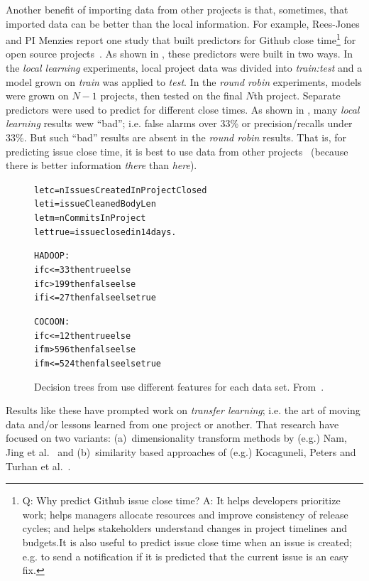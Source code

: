Another benefit of  importing data from other projects is that, sometimes,
that imported data can be better than the local information.
For example, Rees-Jones and PI Menzies
report one study that built  predictors
for Github  close time\footnote{Q: Why predict Github issue close time? A:
 It helps developers prioritize work; helps managers allocate resources and improve consistency of release cycles; and helps stakeholders understand changes in project timelines and budgets.It is also useful to predict issue close time when an issue is created; e.g.  to send a notification if it is predicted that the current issue is an easy fix.}
 for open source projects~\cite{rees2017better}. As shown in ,
these predictors were built in two ways.
In the {\em local learning} experiments,
local  project data was divided into 
{\em train:test} and  a
  model grown on {\em train} was applied to 
{\em test}.  In the {\em round robin} experiments,
models were grown on $N-1$ projects,
then tested on the final $N$th project. 
Separate  predictors were used to predict for different close times.
As shown in ,
many {\em local learning} results wew
  ``bad'';
i.e. false alarms over 33\% or precision/recalls
under 33\%. But such ``bad'' results are absent in the {\em round robin} results.
That is, for predicting  issue close time, it is best to use data from other  projects~\cite{rees2017better}
(because there is better  information {\em there}
than {\em here}).

 \begin{figure}
   {\scriptsize
  \renewcommand{\baselinestretch}{.80} 
 \begin{alltt}   
  {\sffamily let} c    = nIssuesCreatedInProjectClosed
  {\sffamily let} i    = issueCleanedBodyLen
  {\sffamily let} m    = nCommitsInProject 
  {\sffamily let} true = issue closed in 14 days. 
    
  HADOOP:     
  {\sffamily if} c <= 33 {\sffamily then} true {\sffamily else} 
     {\sffamily if} c > 199 {\sffamily then} false {\sffamily else}
        {\sffamily if}  i <= 27 {\sffamily then} false {\sffamily else} true 
 
  COCOON:  
  {\sffamily if} c <= 12 {\sffamily then} true {\sffamily else}
     {\sffamily if} m > 596 {\sffamily then} false {\sffamily else}
        {\sffamily if} m <= 524 {\sffamily then} false {\sffamily else} true\end{alltt}}
  \caption{ Decision trees from   use different features for each  data set. From~\protect\cite{rees2017better}.}\label{fig:unstable} 
 \end{figure}	Results like  these have prompted   work on {\em transfer learning};
i.e.  the art of moving data and/or lessons learned from one project or another.
That research have focused on two  variants: (a)~dimensionality transform  methods by (e.g.) Nam, 
Jing et al.~\cite{nam2017heterogeneous,Nam2015,Jing2015} and (b)~similarity based 
approaches of (e.g.) Kocaguneli, Peters and Turhan et  
al.~\cite{kocaguneli2011find,kocaguneli2012,turhan09,peters15}. 

